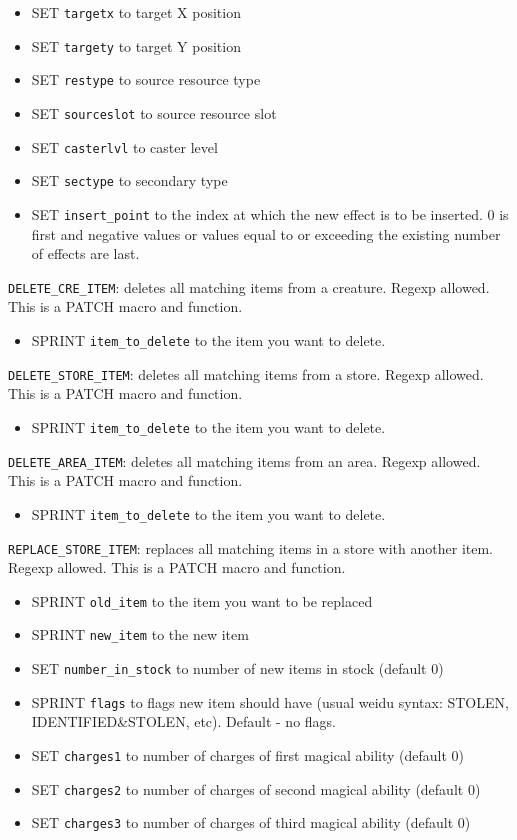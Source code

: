 \documentclass{article}
\begin{document}
\begin{itemize}
\item SET \verb+targetx+ to target X position
\item SET \verb+targety+ to target Y position
\item SET \verb+restype+ to source resource type
\item SET \verb+sourceslot+ to source resource slot
\item SET \verb+casterlvl+ to caster level
\item SET \verb+sectype+ to secondary type
\item SET \verb+insert_point+ to the index at which the new effect
  is to be inserted. 0 is first and negative values or values
  equal to or exceeding the existing number of effects are last.
\end{itemize}

\verb+DELETE_CRE_ITEM+: deletes all matching items from a creature. Regexp allowed.
This is a PATCH macro and function.
\begin{itemize}
\item SPRINT \verb+item_to_delete+ to the item you want to delete.
\end{itemize}

\verb+DELETE_STORE_ITEM+: deletes all matching items from a store. Regexp allowed.
This is a PATCH macro and function.
\begin{itemize}
\item SPRINT \verb+item_to_delete+ to the item you want to delete.
\end{itemize}

\verb+DELETE_AREA_ITEM+: deletes all matching items from an area. Regexp allowed.
This is a PATCH macro and function.
\begin{itemize}
\item SPRINT \verb+item_to_delete+ to the item you want to delete.
\end{itemize}

\verb+REPLACE_STORE_ITEM+: replaces all matching items in a store with another item. Regexp allowed.
This is a PATCH macro and function.
\begin{itemize}
\item SPRINT \verb+old_item+ to the item you want to be replaced
\item SPRINT \verb+new_item+ to the new item
\item SET \verb+number_in_stock+ to number of new items in stock (default 0)
\item SPRINT \verb+flags+ to flags new item should have (usual weidu syntax: STOLEN, IDENTIFIED&STOLEN, etc). Default - no flags.
\item SET \verb+charges1+ to number of charges of first magical ability (default 0)
\item SET \verb+charges2+ to number of charges of second magical ability (default 0)
\item SET \verb+charges3+ to number of charges of third magical ability (default 0)
\end{itemize}
\end{document}
